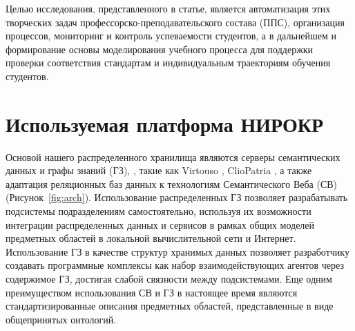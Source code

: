 \documentclass[
]{aiitart}
\begin{document}


Целью исследования, представленного в статье, является автоматизация этих творческих задач профессорско-преподавательского состава (ППС), организация процессов, мониторинг и контроль успеваемости студентов, а в дальнейшем и формирование основы моделирования учебного процесса для поддержки проверки соответствия стандартам и индивидуальным траекториям обучения студентов.

\section{Используемая платформа НИРОКР}

Основой нашего распределенного хранилища являются серверы семантических данных и графы знаний (ГЗ), \cite{kg}, такие как Virtouso \cite{virtuoso}, ClioPatria \cite{b8}, а также адаптация реляционных баз данных к технологиям Семантического Веба (СВ)~\cite{tbl} (Рисунок~\ref{fig:arch}). Использование распределенных ГЗ позволяет разрабатывать подсистемы подразделениям самостоятельно, используя их возможности интеграции распределенных данных и сервисов в рамках общих моделей предметных областей в локальной вычислительной сети и Интернет. Использование ГЗ в качестве структур хранимых данных позволяет разработчику создавать программные комплексы как набор взаимодействующих агентов через содержимое ГЗ, достигая слабой связности между подсистемами. Еще одним преимуществом использования СВ и ГЗ в настоящее время являются стандартизированные описания предметных областей, представленные в виде общепринятых онтологий.
\end{document}
